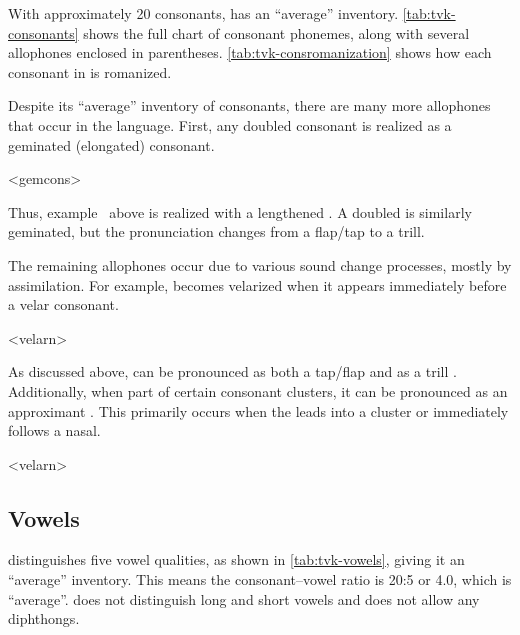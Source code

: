 With approximately 20 consonants, \langtvk{} has an \enquote{average} inventory.\autocite{wals-1} \autoref{tab:tvk-consonants} shows the full chart of consonant phonemes, along with several allophones enclosed in parentheses. \autoref{tab:tvk-consromanization} shows how each consonant in \langtvk{} is romanized.

Despite its \enquote{average} inventory of consonants, there are many more allophones that occur in the language. First, any doubled consonant is realized as a geminated (elongated) consonant.

\pex<gemcons>
	  
\xe

Thus, example~ above is realized with a lengthened . A doubled  is similarly geminated, but the pronunciation changes from a flap/tap to a trill.

The remaining allophones occur due to various sound change processes, mostly by assimilation. For example,  becomes velarized when it appears immediately before a velar consonant.

\ex<velarn>
	  
\xe

As discussed above,  can be pronounced as both a tap/flap  and as a trill . Additionally, when part of certain consonant clusters, it can be pronounced as an approximant . This primarily occurs when the  leads into a cluster or immediately follows a nasal.

\ex<velarn>
	  
\xe

\subsection{Vowels}
\label{subsec:tvk-vowels}


\langtvk{} distinguishes five vowel qualities, as shown in \autoref{tab:tvk-vowels}, giving it an \enquote{average} inventory.\autocite{wals-2} This means the consonant--vowel ratio is 20:5 or 4.0, which is \enquote{average}.\autocite{wals-3} \langtvk{} does not distinguish long and short vowels and does not allow any diphthongs.


